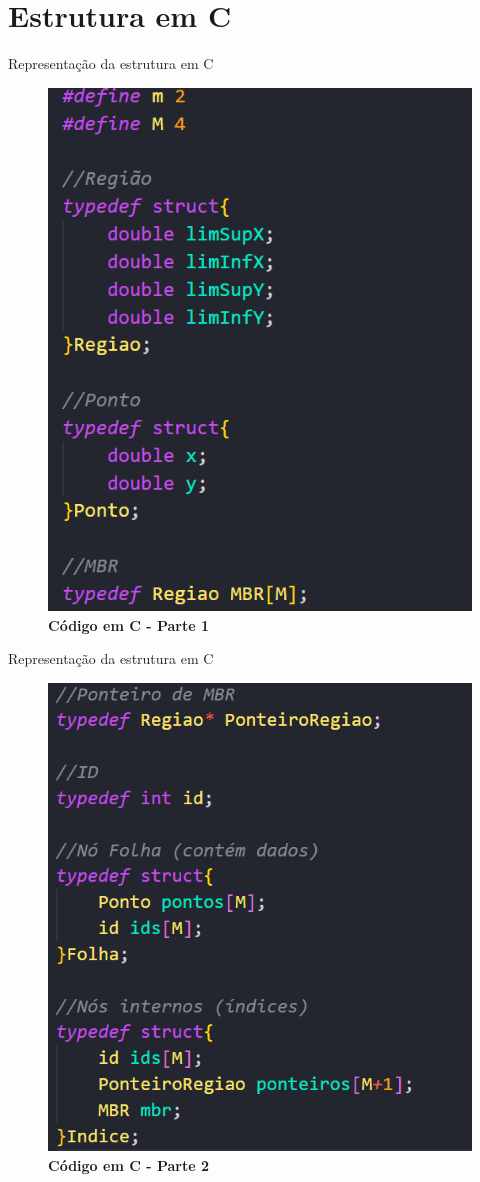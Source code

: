 \documentclass[compress,aspectratio=169]{beamer}
\begin{document}
\section{Estrutura em C}
\begin{frame}{Representação da estrutura em C}
   \begin{figure}[] 
        \centering
        \includegraphics[width=0.33\linewidth]{code1.png}
        \caption{\textbf{Código em C - Parte 1}}
        \label{fig:enter-label}
  
\end{figure}
\end{frame}

\begin{frame}{Representação da estrutura em C}
   \begin{figure}[] 
        \centering
        \includegraphics[width=0.33\linewidth]{code2.png}
        \caption{\textbf{Código em C - Parte 2}}
        \label{fig:enter-label}
  
\end{figure}
\end{frame}
\end{document}
